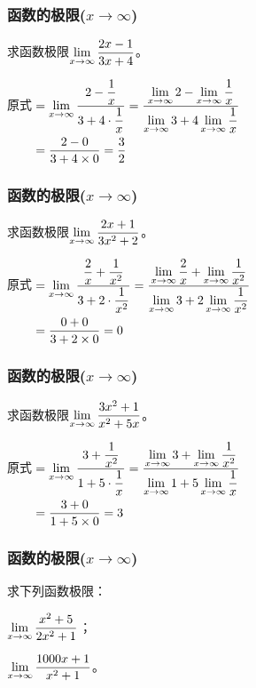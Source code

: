 \documentclass[14pt,notheorems,leqno,xcolor={rgb}]{beamer} %
\begin{document}
\begin{frame}
\frametitle{函数的极限($x\to\infty$)}
\begin{example}
求函数极限$\lim\limits_{x\to\infty}\dfrac{2x-1}{3x+4}$。
\end{example}
\vpause
\begin{solution}
原式\unskip$\begin{aligned}[t]
&=\lim\limits_{x\to\infty}\dfrac{2-\dfrac1x}{3+4\cdot\dfrac1x}
 =\dfrac{\lim\limits_{x\to\infty}2-\lim\limits_{x\to\infty}\dfrac1x}{\lim\limits_{x\to\infty}3+4\lim\limits_{x\to\infty}\dfrac1x}\\
&=\frac{2-0}{3+4\times0}=\frac32
\end{aligned}$
\end{solution}
\end{frame}

\begin{frame}
\frametitle{函数的极限($x\to\infty$)}
\begin{example}
求函数极限$\lim\limits_{x\to\infty}\dfrac{2x+1}{3x^2+2}$。
\end{example}
\vpause
\begin{solution}
原式\unskip$\begin{aligned}[t]
&=\lim\limits_{x\to\infty}\dfrac{\dfrac2x+\dfrac1{x^2}}{3+2\cdot\dfrac1{x^2}}
 =\dfrac{\lim\limits_{x\to\infty}\dfrac2x+\lim\limits_{x\to\infty}\dfrac1{x^2}}{\lim\limits_{x\to\infty}3+2\lim\limits_{x\to\infty}\dfrac1{x^2}}\\
&=\frac{0+0}{3+2\times0}=0
\end{aligned}$
\end{solution}
\end{frame}

\begin{frame}
\frametitle{函数的极限($x\to\infty$)}
\begin{example}
求函数极限$\lim\limits_{x\to\infty}\dfrac{3x^2+1}{x^2+5x}$。
\end{example}
\vpause
\begin{solution}
原式\unskip$\begin{aligned}[t]
&=\lim\limits_{x\to\infty}\dfrac{3+\dfrac1{x^2}}{1+5\cdot\dfrac1{x}}
 =\dfrac{\lim\limits_{x\to\infty}3+\lim\limits_{x\to\infty}\dfrac1{x^2}}{\lim\limits_{x\to\infty}1+5\lim\limits_{x\to\infty}\dfrac1{x}}\\
&=\frac{3+0}{1+5\times0}=3
\end{aligned}$
\end{solution}
\end{frame}

\begin{oframe}
\frametitle{函数的极限($x\to\infty$)}
\begin{exercise}
求下列函数极限：
\begin{enumlite}
  \item $\lim\limits_{x\to\infty}\dfrac{x^2+5}{2x^2+1}$；
  \item $\lim\limits_{x\to\infty}\dfrac{1000x+1}{x^2+1}$。
\end{enumlite}
\end{exercise}
\end{oframe}
\end{document}
